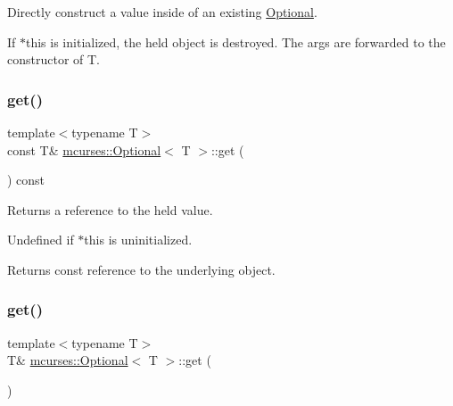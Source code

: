 Directly construct a value inside of an existing \hyperlink{classmcurses_1_1Optional}{Optional}. 

If $\ast$this is initialized, the held object is destroyed. The {\ttfamily args} are forwarded to the constructor of T. \hypertarget{classmcurses_1_1Optional_ac85ab4b82668d46e40f0ad02b83d047e}{}\label{classmcurses_1_1Optional_ac85ab4b82668d46e40f0ad02b83d047e} 
\subsubsection{\texorpdfstring{get()}{get()}\hspace{0.1cm}{\footnotesize\ttfamily [1/2]}}
{\footnotesize\ttfamily template$<$typename T$>$ \\
const T\& \hyperlink{classmcurses_1_1Optional}{mcurses\+::\+Optional}$<$ T $>$\+::get (\begin{DoxyParamCaption}{ }\end{DoxyParamCaption}) const\hspace{0.3cm}{\ttfamily [inline]}}



Returns a reference to the held value. 

Undefined if $\ast$this is uninitialized. \begin{DoxyReturn}{Returns}
const reference to the underlying object. 
\end{DoxyReturn}
\hypertarget{classmcurses_1_1Optional_a353d8df8a75234d372b3a0b0027f2afd}{}\label{classmcurses_1_1Optional_a353d8df8a75234d372b3a0b0027f2afd} 
\subsubsection{\texorpdfstring{get()}{get()}\hspace{0.1cm}{\footnotesize\ttfamily [2/2]}}
{\footnotesize\ttfamily template$<$typename T$>$ \\
T\& \hyperlink{classmcurses_1_1Optional}{mcurses\+::\+Optional}$<$ T $>$\+::get (\begin{DoxyParamCaption}{ }\end{DoxyParamCaption})\hspace{0.3cm}{\ttfamily [inline]}}




